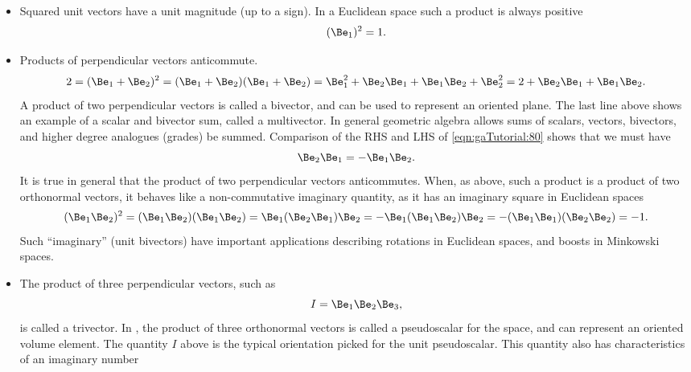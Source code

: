 \begin{itemize}
\item Squared unit vectors have a unit magnitude (up to a sign).  In a Euclidean space such a product is always positive
%
\begin{equation}\label{eqn:gaTutorial:60}
(\Be_1)^2 = 1.
\end{equation}
%
\item Products of perpendicular vectors anticommute.
%
\begin{dmath}\label{eqn:gaTutorial:80}
2
=
(\Be_1 + \Be_2)^2
= (\Be_1 + \Be_2)(\Be_1 + \Be_2)
= \Be_1^2 + \Be_2 \Be_1 + \Be_1 \Be_2 + \Be_2^2
= 2 + \Be_2 \Be_1 + \Be_1 \Be_2.
\end{dmath}
%
A product of two perpendicular vectors is called a bivector, and can be used to represent an oriented plane.  The last line above shows an example of a scalar and bivector sum, called a multivector.  In general geometric algebra allows sums of scalars, vectors, bivectors, and higher degree analogues (grades) be summed.
%
Comparison of the RHS and LHS of \cref{eqn:gaTutorial:80} shows that we must have
%
\begin{equation}\label{eqn:gaTutorial:100}
\Be_2 \Be_1 = -\Be_1 \Be_2.
\end{equation}
%
It is true in general that the product of two perpendicular vectors anticommutes.  When, as above, such a product is a product of
two orthonormal vectors, it behaves like a non-commutative imaginary quantity, as it has an imaginary square in Euclidean spaces
%
\begin{dmath}\label{eqn:gaTutorial:120}
(\Be_1 \Be_2)^2
=
(\Be_1 \Be_2)
(\Be_1 \Be_2)
=
\Be_1 (\Be_2
\Be_1) \Be_2
=
-\Be_1 (\Be_1
\Be_2) \Be_2
=
-(\Be_1 \Be_1)
(\Be_2 \Be_2)
=-1.
\end{dmath}
%
Such ``imaginary'' (unit bivectors) have important applications describing rotations in Euclidean spaces, and boosts in Minkowski spaces.
%
\item
The product of three perpendicular vectors, such as
%
\begin{equation}\label{eqn:gaTutorial:140}
I = \Be_1 \Be_2 \Be_3,
\end{equation}
%
is called a trivector.  In , the product of three orthonormal vectors is called a pseudoscalar for the space, and can represent an oriented volume element.  The quantity \( I \) above is the typical orientation picked for the  unit pseudoscalar.  This quantity also has characteristics of an imaginary number
%
\begin{dmath}\label{eqn:gaTutorial:160}

\end{dmath}
\end{itemize}
